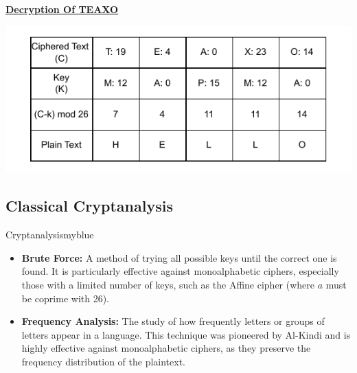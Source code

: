 \vspace{1cm}

\textbf{\underline{Decryption Of TEAXO}}

\vspace{0.25cm}

\begin{center}
    \includegraphics{Chapters/Diagram/Crypto/v2.drawio.pdf}
\end{center}

\newpage
\subsection{Classical Cryptanalysis}
\begin{prettyBox}{Cryptanalysis}{myblue}
\begin{itemize}
    \item \textbf{Brute Force:} A method of trying all possible keys until
the correct one is found. It is particularly effective against monoalphabetic
ciphers, especially those with a limited number of keys, such as the Affine
cipher (where \(a\) must be coprime with 26).  
    \item \textbf{Frequency Analysis:} The study of how frequently letters or
groups of letters appear in a language. This technique was pioneered by
Al-Kindi and is highly effective against monoalphabetic ciphers, 
as they preserve the frequency distribution of the plaintext.
\end{itemize}
\end{prettyBox}
